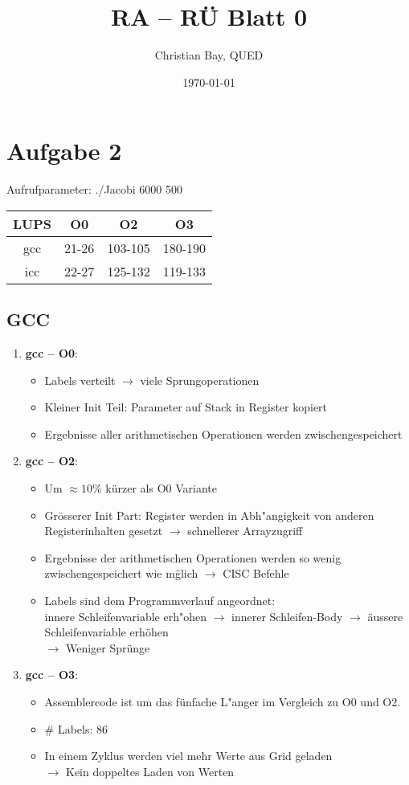 \documentclass{article}
\title{RA -- R\"U Blatt 0}
\author{Christian Bay, QUED}
\date{\today}
\begin{document}
\maketitle
\section*{Aufgabe 2}

Aufrufparameter: ./Jacobi 6000 500

\begin{tabular}{| c || c | c | c |}
	LUPS & O0 & O2 & O3 \\
	\hline \hline
	gcc  & 21-26  & 103-105  & 180-190 \\
	\hline
	icc  & 22-27  & 125-132  & 119-133 \\
	\hline
\end{tabular}

\subsection*{GCC}
\begin{enumerate}
	\item{ \textbf{gcc -- O0}:
			\begin{itemize}
				\item Labels verteilt $\rightarrow$ viele Sprungoperationen
				\item Kleiner Init Teil: Parameter auf Stack in Register kopiert
				\item Ergebnisse aller arithmetischen Operationen werden zwischengespeichert
			\end{itemize}
		}
	\item{ \textbf{gcc -- O2}:
			\begin{itemize}
				\item Um $\approx 10\%$ k\"urzer als O0 Variante
				\item Gr\"osserer Init Part: Register werden in Abh"angigkeit
					von anderen Registerinhalten gesetzt $\rightarrow$ schnellerer Arrayzugriff
				\item Ergebnisse der arithmetischen Operationen werden so wenig
					zwischengespeichert wie m\"glich $\rightarrow$ CISC Befehle
				\item Labels sind dem Programmverlauf angeordnet:\\
					innere Schleifenvariable erh"ohen $\rightarrow$ innerer Schleifen-Body $\rightarrow$
					\"aussere Schleifenvariable erh\"ohen\\
					$\longrightarrow$ Weniger Spr\"unge
			\end{itemize}
		}
	\item{ \textbf{gcc -- O3}:
			\begin{itemize}
				\item Assemblercode ist um das f\"unfache L"anger im Vergleich
					zu O0 und O2.
				\item \# Labels: 86
				\item In einem Zyklus werden viel mehr Werte aus Grid geladen\\
					$\rightarrow$ Kein doppeltes Laden von Werten
			\end{itemize}
		}
\end{enumerate}
\end{document}
